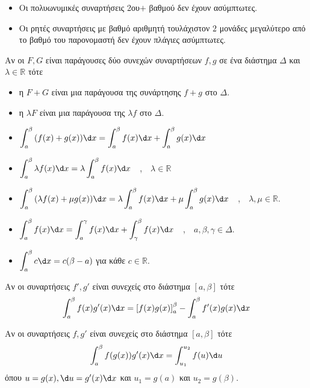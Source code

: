 \begin{itemize}
\item Οι πολυωνυμικές συναρτήσεις 2ου$+$ βαθμού δεν έχουν ασύμπτωτες.
\item Οι ρητές συναρτήσεις με βαθμό αριθμητή τουλάχιστον $2$ μονάδες μεγαλύτερο από το βαθμό του παρονομαστή δεν έχουν πλάγιες ασύμπτωτες.
\end{itemize}
Αν οι $F,G$ είναι παράγουσες δύο συνεχών συναρτήσεων $f,g$ σε ένα διάστημα $\Delta$ και $\lambda\in\mathbb{R}$ τότε
\begin{itemize}
\item η $F+G$ είναι μια παράγουσα της συνάρτησης $f+g$ στο $\Delta$.
\item η $\lambda F$ είναι μια παράγουσα της $\lambda f$ στο $\Delta$.
\end{itemize}
\vspace{-5mm}
\begin{itemize}
\item $\displaystyle\int_{a}^{\beta}{(f(x)+g(x))\d x}=\int_{a}^{\beta}{f(x)\d x}+\int_{a}^{\beta}{g(x)\d x}$
\item $\displaystyle\int_{a}^{\beta}{\lambda f(x)\d x}=\lambda\int_{a}^{\beta}{f(x)\d x}$\ \ ,\ \ $\lambda\in\mathbb{R}$
\item $\displaystyle\int_{a}^{\beta}{(\lambda f(x)+\mu g(x))\d x}=\lambda\int_{a}^{\beta}{f(x)\d x}+\mu\int_{a}^{\beta}{g(x)\d x}$\ \ ,\ \ $\lambda,\mu\in\mathbb{R}$.
\item $\displaystyle\int_{a}^{\beta}{f(x)\d x}=\int_{a}^{\gamma}{f(x)\d x}+\int_{\gamma}^{\beta}{f(x)\d x}$\ \ ,\ \ $a,\beta,\gamma\in\Delta$.
\item $\displaystyle\int_{a}^{\beta}{c\d x}=c(\beta-a)$ για κάθε $c\in\mathbb{R}$.
\end{itemize}

Αν οι συναρτήσεις $f',g'$ είναι συνεχείς στο διάστημα $[a,\beta]$ τότε
\[\int_{a}^{\beta}{f(x)g'(x)\d x}=\left[f(x)g(x)\right]_{a}^{\beta}-\int_{a}^{\beta}{f'(x)g(x)\d x}\]

Αν οι συναρτήσεις $f,g'$ είναι συνεχείς στο διάστημα $[a,\beta]$ τότε
\[\int_{a}^{\beta}{f(g(x))g'(x)\d x}=\int_{u_1}^{u_2}{f(u)\d u}\]
όπου $u=g(x), \d u=g'(x)\d x$ και $u_1=g(a)$ και $u_2=g(\beta)$.

